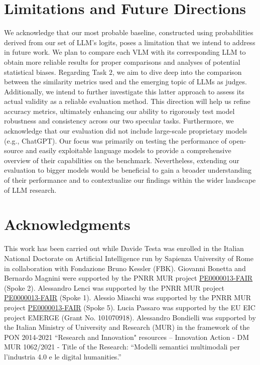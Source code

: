\section*{Limitations and Future Directions}

We acknowledge that our most probable baseline, constructed using probabilities derived from our set of LLM's logits, poses a limitation that we intend to address in future work. We plan to compare each VLM with its corresponding LLM to obtain more reliable results for proper comparisons and analyses of potential statistical biases. Regarding Task $2$, we aim to dive deep into the comparison between the similarity metrics used and the emerging topic of LLMs as judges. Additionally, we intend to further investigate this latter approach to assess its actual validity as a reliable evaluation method. This direction will help us refine accuracy metrics, ultimately enhancing our ability to rigorously test model robustness and consistency across our two specular tasks. Furthermore, we acknowledge that our evaluation did not include large-scale proprietary models (e.g., ChatGPT). Our focus was primarily on testing the performance of open-source and easily exploitable language models to provide a comprehensive overview of their capabilities on the benchmark. Nevertheless, extending our evaluation to bigger models would be beneficial to gain a broader understanding of their performance and to contextualize our findings within the wider landscape of LLM research.

\section*{Acknowledgments}
This work has been carried out while Davide Testa was enrolled in the Italian National Doctorate on Artificial Intelligence run by Sapienza University of Rome in collaboration with Fondazione Bruno Kessler (FBK). Giovanni Bonetta and Bernardo Magnini were supported by the PNRR MUR project \href{https://fondazione-fair.it/}{PE0000013-FAIR} (Spoke 2). Alessandro Lenci was supported by the PNRR MUR project \href{https://fondazione-fair.it/}{PE0000013-FAIR} (Spoke 1). Alessio Miaschi was supported by the PNRR MUR project \href{https://fondazione-fair.it/}{PE0000013-FAIR} (Spoke 5). Lucia Passaro was supported by the EU EIC project EMERGE (Grant No. 101070918).
Alessandro Bondielli was supported by the Italian Ministry of University and Research (MUR) in the framework of the PON 2014-2021 ``Research and Innovation" resources – Innovation Action - DM MUR 1062/2021 - Title of the Research: ``Modelli semantici multimodali per l’industria 4.0 e le digital humanities.''